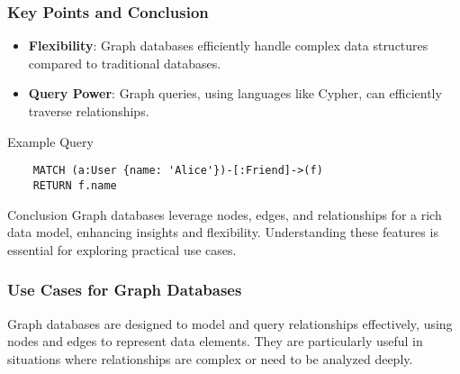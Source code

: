 \documentclass[aspectratio=169]{beamer}
\begin{document}
\begin{frame}[fragile]
    \frametitle{Key Points and Conclusion}
    \begin{itemize}
        \item \textbf{Flexibility}: Graph databases efficiently handle complex data structures compared to traditional databases.
        \item \textbf{Query Power}: Graph queries, using languages like Cypher, can efficiently traverse relationships.
    \end{itemize}
    
    \begin{block}{Example Query}
    \begin{lstlisting}
    MATCH (a:User {name: 'Alice'})-[:Friend]->(f)
    RETURN f.name
    \end{lstlisting}
    \end{block}
    
    \begin{block}{Conclusion}
        Graph databases leverage nodes, edges, and relationships for a rich data model, enhancing insights and flexibility. 
        Understanding these features is essential for exploring practical use cases.
    \end{block}
\end{frame}

\begin{frame}[fragile]
    \frametitle{Use Cases for Graph Databases}
    Graph databases are designed to model and query relationships effectively, using nodes and edges to represent data elements. They are particularly useful in situations where relationships are complex or need to be analyzed deeply.
\end{frame}
\end{document}
